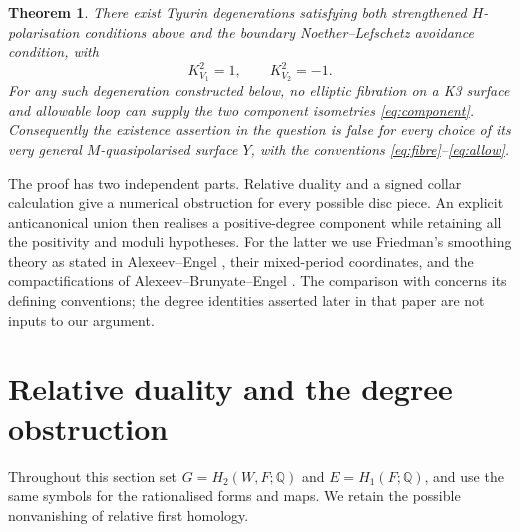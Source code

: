 \documentclass[11pt]{article}
\newtheorem{theorem}{Theorem}[section]
\theoremstyle{definition}
\theoremstyle{remark}
\newcommand{\Q}{\mathbb Q}
\begin{document}
\begin{theorem}\label{thm:main}
There exist Tyurin degenerations satisfying both strengthened $H$-polarisation conditions above and the boundary Noether--Lefschetz avoidance condition, with
\[
K_{V_1}^2=1,\qquad K_{V_2}^2=-1.
\]
For any such degeneration constructed below, no elliptic fibration on a K3 surface and allowable loop can supply the two component isometries \eqref{eq:component}. Consequently the existence assertion in the question is false for every choice of its very general $M$-quasipolarised surface $Y$, with the conventions \eqref{eq:fibre}--\eqref{eq:allow}.
\end{theorem}

The proof has two independent parts. Relative duality and a signed collar calculation give a numerical obstruction for every possible disc piece. An explicit anticanonical union then realises a positive-degree component while retaining all the positivity and moduli hypotheses. For the latter we use Friedman's smoothing theory as stated in Alexeev--Engel \cite[Theorem~3.5 and \S7A]{AE}, their mixed-period coordinates, and the compactifications of Alexeev--Brunyate--Engel \cite{ABE}. The comparison with \cite{GT} concerns its defining conventions; the degree identities asserted later in that paper are not inputs to our argument.

\section{Relative duality and the degree obstruction}

Throughout this section set $G=H_2(W,F;\Q)$ and $E=H_1(F;\Q)$, and use the same symbols for the rationalised forms and maps. We retain the possible nonvanishing of relative first homology.
\end{document}
